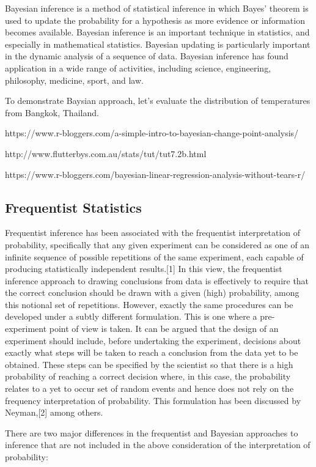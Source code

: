 \documentclass{article}\usepackage[]{graphicx}\usepackage[]{color}
\begin{document}
Bayesian inference is a method of statistical inference in which Bayes' theorem is used to update the probability for a hypothesis as more evidence or information becomes available. Bayesian inference is an important technique in statistics, and especially in mathematical statistics. Bayesian updating is particularly important in the dynamic analysis of a sequence of data. Bayesian inference has found application in a wide range of activities, including science, engineering, philosophy, medicine, sport, and law. 

To demonstrate Baysian approach, let's evaluate the distribution of temperatures from Bangkok, Thailand. 

https://www.r-bloggers.com/a-simple-intro-to-bayesian-change-point-analysis/
	
http://www.flutterbys.com.au/stats/tut/tut7.2b.html

https://www.r-bloggers.com/bayesian-linear-regression-analysis-without-tears-r/
    


\subsection{Frequentist Statistics}

Frequentist inference has been associated with the frequentist interpretation of probability, specifically that any given experiment can be considered as one of an infinite sequence of possible repetitions of the same experiment, each capable of producing statistically independent results.[1] In this view, the frequentist inference approach to drawing conclusions from data is effectively to require that the correct conclusion should be drawn with a given (high) probability, among this notional set of repetitions. However, exactly the same procedures can be developed under a subtly different formulation. This is one where a pre-experiment point of view is taken. It can be argued that the design of an experiment should include, before undertaking the experiment, decisions about exactly what steps will be taken to reach a conclusion from the data yet to be obtained. These steps can be specified by the scientist so that there is a high probability of reaching a correct decision where, in this case, the probability relates to a yet to occur set of random events and hence does not rely on the frequency interpretation of probability. This formulation has been discussed by Neyman,[2] among others.

There are two major differences in the frequentist and Bayesian approaches to inference that are not included in the above consideration of the interpretation of probability:
\end{document}
